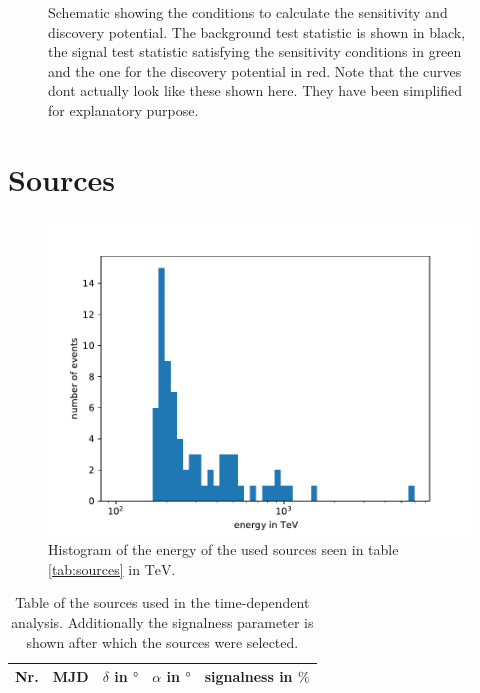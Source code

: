 \begin{figure}
\caption{Schematic showing the conditions to calculate the sensitivity and discovery potential. The background test statistic is shown in black, the signal test statistic satisfying the sensitivity conditions in green and the one for the discovery potential in red. Note that the curves dont actually look like these shown here. They have been simplified for explanatory purpose.}
\label{fig:sens_disc_schem}
\end{figure}

\section{Sources}

\begin{figure}
    \centering
    \includegraphics[width=\linewidth]{Plots/appendix/sources_energy.pdf}
    \caption{Histogram of the energy of the used sources seen in table \ref{tab:sources} in $\si{\tera\electronvolt}$.}
    \label{fig:sources_energy}
\end{figure}

\begin{table}
  \centering
  \caption{Table of the sources used in the time-dependent analysis. Additionally the signalness parameter is shown after which the sources were selected.}
  \label{tab:sources_time_dep}
  \begin{tabular}{ccrrc}
    \toprule
    Nr. & MJD &  $\delta$ in $\si{\degree}$ & $\alpha$ in $\si{\degree}$ & signalness in $\si{\percent}$ \\
    \toprule
      
    \toprule
  \end{tabular}
\end{table}

